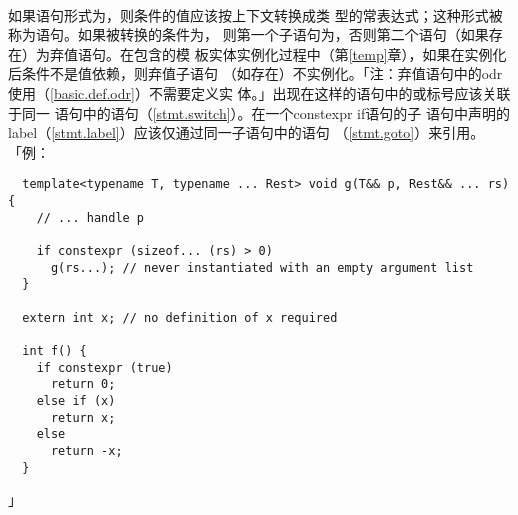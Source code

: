 \paragraph{}
如果语句形式为，则条件的值应该按上下文转换成类
型的常表达式；这种形式被称为语句。如果被转换的条件为，
则第一个子语句为，否则第二个语句（如果存在）为弃值语句。在包含的模
板实体实例化过程中（第\ref{temp}章），如果在实例化后条件不是值依赖，则弃值子语句
（如存在）不实例化。「注：弃值语句中的odr使用（\ref{basic.def.odr}）不需要定义实
体。」出现在这样的语句中的或标号应该关联于同一
语句中的语句（\ref{stmt.switch}）。在一个constexpr if语句的子
语句中声明的label（\ref{stmt.label}）应该仅通过同一子语句中的语句
（\ref{stmt.goto}）来引用。「例：
\begin{lstlisting}
  template<typename T, typename ... Rest> void g(T&& p, Rest&& ... rs) {
    // ... handle p

    if constexpr (sizeof... (rs) > 0)
      g(rs...); // never instantiated with an empty argument list
  }

  extern int x; // no definition of x required

  int f() {
    if constexpr (true)
      return 0;
    else if (x)
      return x;
    else
      return -x;
  }
\end{lstlisting}」

